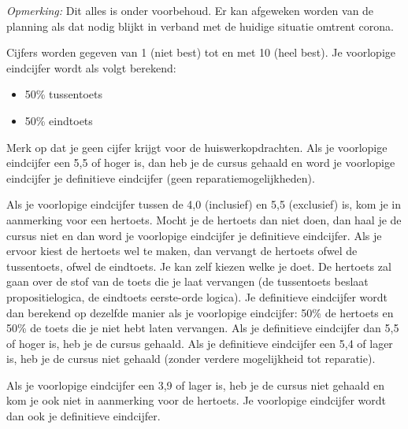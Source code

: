 \emph{Opmerking:} Dit alles is onder voorbehoud. Er kan afgeweken worden van de planning als dat nodig blijkt in verband met de huidige situatie omtrent corona.

Cijfers worden gegeven van 1 (niet best) tot en met 10 (heel best). Je voorlopige eindcijfer wordt als volgt berekend:

\begin{itemize}
    \item 50\% tussentoets
    \item 50\% eindtoets
\end{itemize}






Merk op dat je geen cijfer krijgt voor de huiswerkopdrachten. Als je voorlopige eindcijfer een 5,5 of hoger is, dan heb je de cursus gehaald en word je voorlopige eindcijfer je definitieve eindcijfer (geen reparatiemogelijkheden).

Als je voorlopige eindcijfer tussen de 4,0 (inclusief) en 5,5 (exclusief) is, kom je in aanmerking voor een hertoets.
Mocht je de hertoets dan niet doen, dan haal je de cursus niet en dan word je voorlopige eindcijfer je definitieve eindcijfer.
Als je ervoor kiest de hertoets wel te maken, dan vervangt de hertoets ofwel de tussentoets, ofwel de eindtoets.
Je kan zelf kiezen welke je doet.
De hertoets zal gaan over de stof van de toets die je laat vervangen (de tussentoets beslaat propositielogica, de eindtoets eerste-orde logica).
Je definitieve eindcijfer wordt dan berekend op dezelfde manier als je voorlopige eindcijfer: 50\% de hertoets en 50\% de toets die je niet hebt laten vervangen.
Als je definitieve eindcijfer dan 5,5 of hoger is, heb je de cursus gehaald.
Als je definitieve eindcijfer een 5,4 of lager is, heb je de cursus niet gehaald (zonder verdere mogelijkheid tot reparatie).  

Als je voorlopige eindcijfer een 3,9 of lager is, heb je de cursus niet gehaald en kom je ook niet in aanmerking voor de hertoets.
Je voorlopige eindcijfer wordt dan ook je definitieve eindcijfer.


